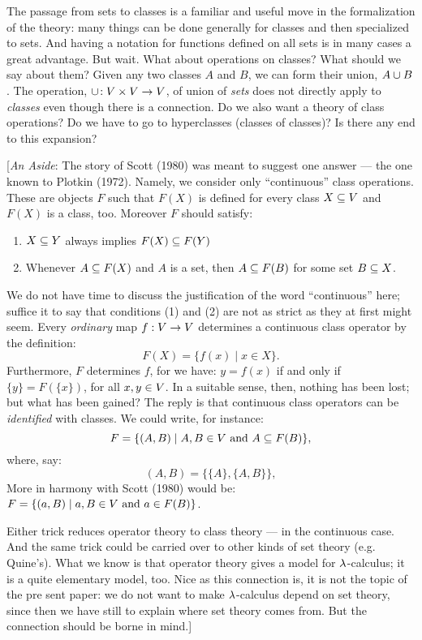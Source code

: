 The passage from sets to classes is a familiar and useful move in the formalization of the theory: many things can be done generally for classes and then specialized to sets. And having a notation for functions defined on all sets is in many cases a great advantage. But wait. What about operations on classes? What should we say about them? Given any two classes $A$ and $B$, we can form their union, $A \cup  B$. The operation, $\cup\!: V \times V \rightarrow V$, of union of {\it sets} does not directly apply to {\it classes} even though there is a connection. Do we also want a theory of class operations? Do we have to go to hyperclasses (classes of classes)? Is there any end to this expansion?


[{\it An Aside}: The story of Scott (1980) was meant to suggest one answer --- the one known to Plotkin (1972). Namely, we consider only ``continuous'' class operations. These are objects $F$ such that $F(X)$ is defined for every class $X \subseteq V$ and $F(X)$ is a class, too. Moreover $F$ should satisfy:

\begin{enumerate}

\item $X \subseteq Y$ always implies $F(X)\subseteq F(Y)$

\item Whenever $A \subseteq F(X)$ and $A$ is a set, then $A\subseteq F(B)$ for some set $B \subseteq X$.

\end{enumerate}
%
We do not have time to discuss the justification of the word ``continuous'' here; suffice it to say that conditions (1) and (2) are not as strict as they at first might seem. Every {\it ordinary} map $f : V \rightarrow V$ determines a continuous class operator by the definition:
$$
F(X) = \{f(x) \mid x \in X\}.
$$
%
Furthermore, $F$ determines $f$, for we have: $y = f(x)$ if and only if $\{y\} =
F(\{x\})$, for all $x,y \in V$. In a suitable sense, then, nothing has been lost; but
what has been gained? The reply is that continuous class operators can be {\it identified}
with classes. We could write, for instance:
$$ F = \{(A,B) \mid A,B \in V {\textrm { and }} A \subseteq F(B) \},$$
where, say:
$$
(A,B) = \{\{A\}, \{A,B\}\},
$$
More in harmony with Scott (1980) would be: $F = \{(a,B) \mid  a,B \in V {\textrm { and } } a \in F(B)\}$.

Either trick reduces operator theory to class theory --- in the continuous case. And the same trick could be carried over to other kinds of set theory (e.g. Quine's). What we know is that operator theory gives a model for $\lambda$-calculus; it is a quite elementary model, too. Nice as this connection is, it is not the topic of the pre sent paper: we do not want to make $\lambda$-calculus depend on set theory, since then we have still to explain where set theory comes from. But the connection should be borne in mind.]

